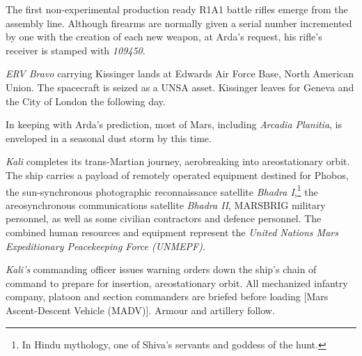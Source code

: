 The first non-experimental production ready R1A1 battle rifles emerge from the assembly line. Although firearms are normally given a serial number incremented by one with the creation of each new weapon, at Arda's request, his rifle's receiver is stamped with {\it 109450}.
\StopTimelineDate

{\it ERV Bravo} carrying Kissinger lands at Edwards Air Force Base, North American Union. The spacecraft is seized as a UNSA asset. Kissinger leaves for Geneva and the City of London the following day.
\StopTimelineDate

In keeping with Arda's prediction, most of Mars, including {\it Arcadia Planitia}, is enveloped in a seasonal dust storm by this time.
\StopTimelineDate

{\it Kali} completes its trans-Martian journey, aerobreaking into areostationary orbit. The ship carries a payload of remotely operated equipment destined for Phobos, the sun-synchronous photographic reconnaissance satellite {\it Bhadra I},\footnote{In Hindu mythology, one of Shiva's servants and goddess of the hunt.} the areosynchronous communications satellite {\it Bhadra II}, MARSBRIG military personnel, as well as some civilian contractors and defence personnel. The combined human resources and equipment represent the {\it United Nations Mars Expeditionary Peacekeeping Force (UNMEPF)}.
\StopTimelineDate

{\it Kali's} commanding officer issues warning orders down the ship's chain of command to prepare for insertion, areostationary orbit. All mechanized infantry company, platoon and section commanders are briefed before loading [Mars Ascent-Descent Vehicle (MADV)]. Armour and artillery follow.
\StopTimelineDate


